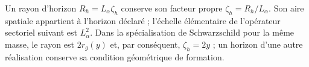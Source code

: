 Un rayon d’horizon \(R_h=L_\alpha\zeta_h\) conserve son
facteur propre \(\zeta_h=R_h/L_\alpha\). Son aire spatiale
appartient à l’horizon déclaré ; l’échelle élémentaire de l’opérateur
sectoriel suivant est \(L_\alpha^2\). Dans la spécialisation
de Schwarzschild pour la même masse, le rayon est \(2r_g(y)\)
et, par conséquent, \(\zeta_h=2y\) ; un horizon d’une autre réalisation
conserve sa condition géométrique de formation.
